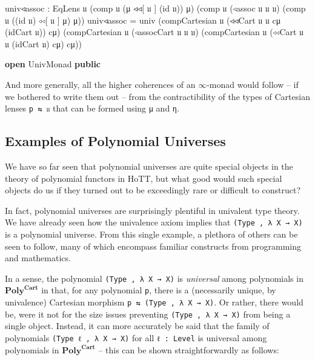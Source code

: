 \documentclass[
  11pt,
  oneside,
  article]{memoir}
\newenvironment{Shaded}{}{}
\newcommand{\KeywordTok}[1]{\textcolor[rgb]{0.00,0.44,0.13}{\textbf{#1}}}
\newcommand{\NormalTok}[1]{#1}
\newcommand{\OtherTok}[1]{\textcolor[rgb]{0.00,0.44,0.13}{#1}}
\theoremstyle{definition}
\theoremstyle{plain}
\newcommand{\Cat}[1]{\mathbf{#1}}%
\newcommand{\poly}{\Cat{Poly}}
\newcommand{\0}{\textsf{0}}
\newcommand{\1}{\tn{\textsf{1}}}
\begin{document}
\begin{Shaded}
\begin{Highlighting}[]
\NormalTok{    univ◃assoc }\OtherTok{:}\NormalTok{ EqLens 𝔲 }\OtherTok{(}\NormalTok{comp 𝔲 }\OtherTok{(}\NormalTok{μ ◃◃[ 𝔲 ] }\OtherTok{(}\NormalTok{id 𝔲}\OtherTok{))}\NormalTok{ μ}\OtherTok{)}
                          \OtherTok{(}\NormalTok{comp 𝔲 }\OtherTok{(}\NormalTok{◃assoc 𝔲 𝔲 𝔲}\OtherTok{)}
                                  \OtherTok{(}\NormalTok{comp 𝔲 }\OtherTok{((}\NormalTok{id 𝔲}\OtherTok{)}\NormalTok{ ◃◃[ 𝔲 ] μ}\OtherTok{)}\NormalTok{ μ}\OtherTok{))}
\NormalTok{    univ◃assoc }\OtherTok{=}\NormalTok{ univ }\OtherTok{(}\NormalTok{compCartesian 𝔲 }\OtherTok{(}\NormalTok{◃◃Cart 𝔲 𝔲 cμ }\OtherTok{(}\NormalTok{idCart 𝔲}\OtherTok{))}\NormalTok{ cμ}\OtherTok{)}
                      \OtherTok{(}\NormalTok{compCartesian 𝔲 }\OtherTok{(}\NormalTok{◃assocCart 𝔲 𝔲 𝔲}\OtherTok{)}
                                       \OtherTok{(}\NormalTok{compCartesian 𝔲 }\OtherTok{(}\NormalTok{◃◃Cart 𝔲 𝔲 }\OtherTok{(}\NormalTok{idCart 𝔲}\OtherTok{)}\NormalTok{ cμ}\OtherTok{)}\NormalTok{ cμ}\OtherTok{))}

\KeywordTok{open}\NormalTok{ UnivMonad }\KeywordTok{public}
\end{Highlighting}
\end{Shaded}

And more generally, all the higher coherences of an \(\infty\)-monad
would follow -- if we bothered to write them out -- from the
contractibility of the types of Cartesian lenses \texttt{p\ ⇆\ 𝔲} that
can be formed using \texttt{μ} and \texttt{η}.

\subsection{Examples of Polynomial
Universes}\label{examples-of-polynomial-universes}

We have so far seen that polynomial universes are quite special objects
in the theory of polynomial functors in HoTT, but what good would such
special objects do us if they turned out to be exceedingly rare or
difficult to construct?

In fact, polynomial universes are surprisingly plentiful in univalent
type theory. We have already seen how the univalence axiom implies that
\texttt{(Type\ ,\ λ\ X\ →\ X)} is a polynomial universe. From this
single example, a plethora of others can be seen to follow, many of
which encompass familiar constructs from programming and mathematics.

In a sense, the polynomial \texttt{(Type\ ,\ λ\ X\ →\ X)} is
\emph{universal} among polynomials in \(\poly^{\mathbf{Cart}}\)
in that, for any polynomial \texttt{p}, there is a (necessarily unique,
by univalence) Cartesian morphism \texttt{p\ ⇆\ (Type\ ,\ λ\ X\ →\ X)}.
Or rather, there would be, were it not for the size issues preventing
\texttt{(Type\ ,\ λ\ X\ →\ X)} from being a single object. Instead, it
can more accurately be said that the family of polynomials
\texttt{(Type\ ℓ\ ,\ λ\ X\ →\ X)} for all \texttt{ℓ\ :\ Level} is
universal among polynomials in \(\poly^{\mathbf{Cart}}\) -- this
can be shown straightforwardly as follows:
\end{document}
